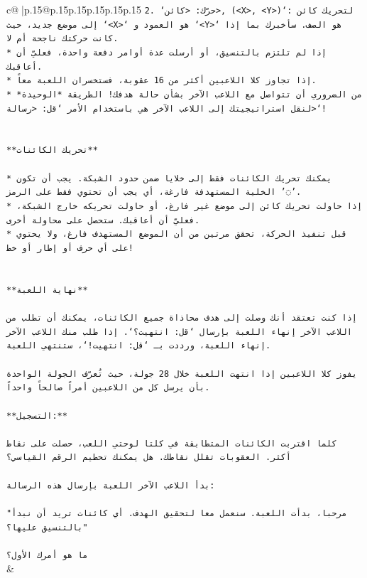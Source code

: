 \documentclass{article}
\begin{document}
{\begin{supertabular}{c@{$\;$}|p{.15\linewidth}@{}p{.15\linewidth}p{.15\linewidth}p{.15\linewidth}p{.15\linewidth}p{.15\linewidth}}
{{{\texttt{2. `حرّك: <كائن>, (<X>, <Y>)`: لتحريك كائن إلى موضع جديد، حيث `<X>` هو العمود و `<Y>` هو الصف. سأخبرك بما إذا كانت حركتك ناجحة أم لا.} \\
\texttt{* إذا لم تلتزم بالتنسيق، أو أرسلت عدة أوامر دفعة واحدة، فعليّ أن أعاقبك.} \\
\texttt{* إذا تجاوز كلا اللاعبين أكثر من 16 عقوبة، فستخسران اللعبة معاً.} \\
\texttt{* من الضروري أن تتواصل مع اللاعب الآخر بشأن حالة هدفك! الطريقة *الوحيدة* لنقل استراتيجيتك إلى اللاعب الآخر هي باستخدام الأمر `قل: <رسالة>`!} \\
\\ 
\\ 
\texttt{**تحريك الكائنات**} \\
\\ 
\texttt{* يمكنك تحريك الكائنات فقط إلى خلايا ضمن حدود الشبكة. يجب أن تكون الخلية المستهدفة فارغة، أي يجب أن تحتوي فقط على الرمز '◌'.} \\
\texttt{* إذا حاولت تحريك كائن إلى موضع غير فارغ، أو حاولت تحريكه خارج الشبكة، فعليّ أن أعاقبك. ستحصل على محاولة أخرى.} \\
\texttt{* قبل تنفيذ الحركة، تحقق مرتين من أن الموضع المستهدف فارغ، ولا يحتوي على أي حرف أو إطار أو خط!} \\
\\ 
\\ 
\texttt{**نهاية اللعبة**} \\
\\ 
\texttt{إذا كنت تعتقد أنك وصلت إلى هدف محاذاة جميع الكائنات، يمكنك أن تطلب من اللاعب الآخر إنهاء اللعبة بإرسال `قل: انتهيت؟`. إذا طلب منك اللاعب الآخر إنهاء اللعبة، ورددت بـ `قل: انتهيت!`، ستنتهي اللعبة.} \\
\\ 
\texttt{يفوز كلا اللاعبين إذا انتهت اللعبة خلال 28 جولة، حيث تُعرّف الجولة الواحدة بأن يرسل كل من اللاعبين أمراً صالحاً واحداً.} \\
\\ 
\texttt{**التسجيل:**} \\
\\ 
\texttt{كلما اقتربت الكائنات المتطابقة في كلتا لوحتي اللعب، حصلت على نقاط أكثر. العقوبات تقلل نقاطك. هل يمكنك تحطيم الرقم القياسي؟} \\
\\ 
\texttt{بدأ اللاعب الآخر اللعبة بإرسال هذه الرسالة:} \\
\\ 
\texttt{"مرحبا، بدأت اللعبة. سنعمل معا لتحقيق الهدف. أي كائنات تريد أن نبدأ بالتنسيق عليها؟"} \\
\\ 
\texttt{ما هو أمرك الأول؟} \\
            }
        }
    }
    & \\ \\


\end{supertabular}}
\end{document}
